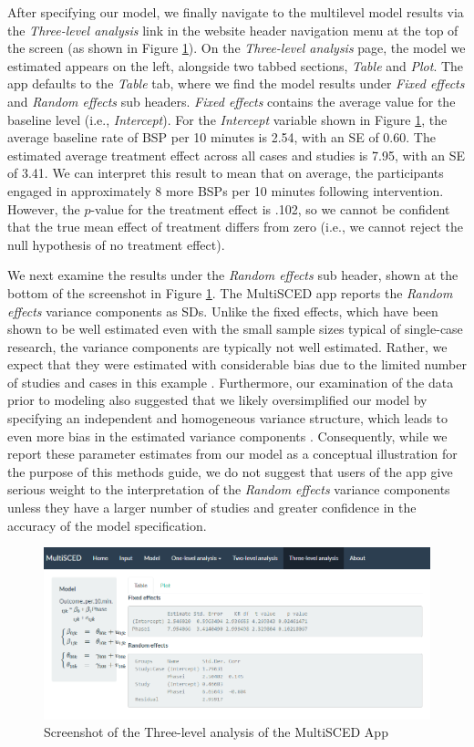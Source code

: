 \documentclass[
]{book}
\begin{document}
After specifying our model, we finally navigate to the multilevel model results via the \emph{Three-level analysis} link in the website header navigation menu at the top of the screen (as shown in Figure \ref{fig:MultiSCED-3level}). On the \emph{Three-level analysis} page, the model we estimated appears on the left, alongside two tabbed sections, \emph{Table} and \emph{Plot}. The app defaults to the \emph{Table} tab, where we find the model results under \emph{Fixed effects} and \emph{Random effects} sub headers. \emph{Fixed effects} contains the average value for the baseline level (i.e., \emph{Intercept}). For the \emph{Intercept} variable shown in Figure \ref{fig:MultiSCED-3level}, the average baseline rate of BSP per 10 minutes is 2.54, with an SE of 0.60. The estimated average treatment effect across all cases and studies is 7.95, with an SE of 3.41. We can interpret this result to mean that on average, the participants engaged in approximately 8 more BSPs per 10 minutes following intervention. However, the \(p\)-value for the treatment effect is .102, so we cannot be confident that the true mean effect of treatment differs from zero (i.e., we cannot reject the null hypothesis of no treatment effect).

We next examine the results under the \emph{Random effects} sub header, shown at the bottom of the screenshot in Figure \ref{fig:MultiSCED-3level}. The MultiSCED app reports the \emph{Random effects} variance components as SDs. Unlike the fixed effects, which have been shown to be well estimated even with the small sample sizes typical of single-case research, the variance components are typically not well estimated. Rather, we expect that they were estimated with considerable bias due to the limited number of studies and cases in this example \citep{Moeyaert_Ugille_Ferron_Beretvas_VandenNoortgate_2013, Owens_Ferron_2012}. Furthermore, our examination of the data prior to modeling also suggested that we likely oversimplified our model by specifying an independent and homogeneous variance structure, which leads to even more bias in the estimated variance components \citep{Joo_et_al_2019}. Consequently, while we report these parameter estimates from our model as a conceptual illustration for the purpose of this methods guide, we do not suggest that users of the app give serious weight to the interpretation of the \emph{Random effects} variance components unless they have a larger number of studies and greater confidence in the accuracy of the model specification.

\begin{figure}
\includegraphics[width=0.6\linewidth]{images/MultiSCED_3level} \caption{Screenshot of the Three-level analysis of the MultiSCED App}\label{fig:MultiSCED-3level}
\end{figure}
\end{document}
